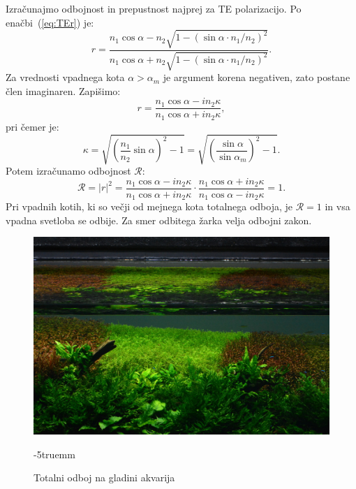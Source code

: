 Izračunajmo odbojnost in prepustnost najprej za TE polarizacijo.
Po enačbi~(\ref{eq:TEr}) je:
\begin{equation}
r = \frac{n_1 \cos \alpha - n_2 \sqrt{1 - (\sin \alpha \cdot n_1/n_2)^2}}
{n_1 \cos \alpha + n_2 \sqrt{1 - (\sin \alpha \cdot n_1/n_2)^2}}.
\label{eq:04_53}
\end{equation}
Za vrednosti vpadnega kota $\alpha > \alpha_m$ je argument korena
negativen, zato postane člen imaginaren. Zapišimo:
\begin{equation}
r = \frac{n_1 \cos \alpha - i n_2 \kappa}{n_1 \cos \alpha + i n_2\kappa},
\label{eq:04_54}
\end{equation}
pri čemer je:
\begin{equation}
\kappa = \sqrt{\left(\frac{n_1}{n_2}\sin \alpha \right)^2-1}  = 
\sqrt{\left(\frac{\sin \alpha}{\sin \alpha_m}\right)^2 -1}.
\label{eq:04_55}
\end{equation}
Potem izračunamo odbojnost $\mathcal{R}$:
\begin{equation}
\mathcal{R} = |r|^2 = \frac{n_1 \cos \alpha -i n_2\kappa}{n_1 \cos \alpha +i n_2\kappa}
\cdot \frac{n_1 \cos \alpha +i n_2\kappa}{n_1 \cos \alpha -i n_2\kappa} = 1.
\label{eq:04_56}
\end{equation}
Pri vpadnih kotih, ki so večji od mejnega kota totalnega odboja, je $\mathcal{R} = 1$
in vsa vpadna svetloba se odbije. Za smer odbitega žarka velja odbojni zakon. 
\begin{figure}[ht]
\centering
\includegraphics[width=10truecm]{slike/04_TotalniOdbojFoto.jpg}
\caption{Totalni odboj na gladini akvarija}
\vglue-5truemm
\label{fig:04_TotalniFoto}
\end{figure}

